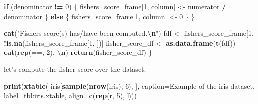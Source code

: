 \documentclass[a4paper,conference]{IEEEtran}
\newenvironment{Shaded}{\begin{snugshade}}{\end{snugshade}}
\newcommand{\AttributeTok}[1]{\textcolor[rgb]{0.13,0.29,0.53}{#1}}
\newcommand{\ControlFlowTok}[1]{\textcolor[rgb]{0.13,0.29,0.53}{\textbf{#1}}}
\newcommand{\DecValTok}[1]{\textcolor[rgb]{0.00,0.00,0.81}{#1}}
\newcommand{\FunctionTok}[1]{\textcolor[rgb]{0.13,0.29,0.53}{\textbf{#1}}}
\newcommand{\NormalTok}[1]{#1}
\newcommand{\OtherTok}[1]{\textcolor[rgb]{0.56,0.35,0.01}{#1}}
\newcommand{\SpecialCharTok}[1]{\textcolor[rgb]{0.81,0.36,0.00}{\textbf{#1}}}
\newcommand{\StringTok}[1]{\textcolor[rgb]{0.31,0.60,0.02}{#1}}
\begin{document}
\begin{Shaded}
\begin{Highlighting}[]
    \ControlFlowTok{if}\NormalTok{ (denominator }\SpecialCharTok{!=} \DecValTok{0}\NormalTok{) \{}
\NormalTok{      fishers\_score\_frame[}\DecValTok{1}\NormalTok{, column] }\OtherTok{\textless{}{-}}\NormalTok{ numerator }\SpecialCharTok{/}\NormalTok{ denominator}
\NormalTok{    \} }\ControlFlowTok{else}\NormalTok{ \{}
\NormalTok{      fishers\_score\_frame[}\DecValTok{1}\NormalTok{, column] }\OtherTok{\textless{}{-}} \DecValTok{0}
\NormalTok{    \}}
\NormalTok{  \}}

  \FunctionTok{cat}\NormalTok{(}\StringTok{"Fisher\textquotesingle{}s score(s) has/have been computed.}\SpecialCharTok{\textbackslash{}n}\StringTok{"}\NormalTok{)}
\NormalTok{  fdf }\OtherTok{\textless{}{-}}\NormalTok{ fishers\_score\_frame[}\DecValTok{1}\NormalTok{, }\SpecialCharTok{!}\FunctionTok{is.na}\NormalTok{(fishers\_score\_frame[}\DecValTok{1}\NormalTok{, ])]}
\NormalTok{  fisher\_score\_df }\OtherTok{\textless{}{-}} \FunctionTok{as.data.frame}\NormalTok{(}\FunctionTok{t}\NormalTok{(fdf))}
  \FunctionTok{cat}\NormalTok{(}\FunctionTok{rep}\NormalTok{(}\StringTok{\textquotesingle{}==\textquotesingle{}}\NormalTok{, }\DecValTok{2}\NormalTok{), }\StringTok{\textquotesingle{}}\SpecialCharTok{\textbackslash{}n}\StringTok{\textquotesingle{}}\NormalTok{)}
  \FunctionTok{return}\NormalTok{(fisher\_score\_df)}
\NormalTok{\}}
\end{Highlighting}
\end{Shaded}

let's compute the fisher score over the dataset.

\begin{Shaded}
\begin{Highlighting}[]
 \FunctionTok{print}\NormalTok{(}\FunctionTok{xtable}\NormalTok{(}
\NormalTok{   iris[}\FunctionTok{sample}\NormalTok{(}\FunctionTok{nrow}\NormalTok{(iris), }\DecValTok{6}\NormalTok{), ],}
   \AttributeTok{caption=}\StringTok{\textquotesingle{}Example of the iris dataset\textquotesingle{}}\NormalTok{,}
   \AttributeTok{label=}\StringTok{\textquotesingle{}tbl:iris.xtable\textquotesingle{}}\NormalTok{,}
   \AttributeTok{align=}\FunctionTok{c}\NormalTok{(}\FunctionTok{rep}\NormalTok{(}\StringTok{\textquotesingle{}r\textquotesingle{}}\NormalTok{, }\DecValTok{5}\NormalTok{), }\StringTok{\textquotesingle{}l\textquotesingle{}}\NormalTok{)))}
\end{Highlighting}
\end{Shaded}
\end{document}

